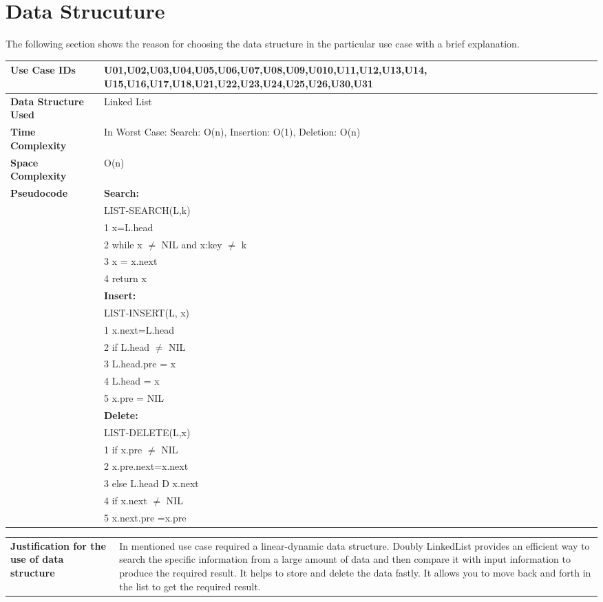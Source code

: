 \documentclass[12pt,a4paper]{report}
\begin{document}
\chapter*{Data Strucuture}
The following section shows the reason for choosing the data structure in the particular use case with a brief explanation.
\begin{center}
\begin{tabular}{ | m{4cm}|m{12cm}| }\hline
\textbf{Use Case IDs}& U01,U02,U03,U04,U05,U06,U07,U08,U09,U010,U11,U12,U13,U14,
U15,U16,U17,U18,U21,U22,U23,U24,U25,U26,U30,U31 \\ \hline
\textbf{Data Structure Used}& Linked List \\ \hline

\textbf{Time Complexity}& 
In Worst Case: Search: O(n), Insertion: O(1), Deletion: O(n)\\\hline
\textbf{Space Complexity}& O(n)\\\hline

\textbf{Pseudocode}& 
\textbf{Search:} \\&
LIST-SEARCH(L,k)\\&
1 x=L.head\\&
2 while x $\neq$ NIL and x:key $\neq$ k \\&
3\hspace{6 mm} x = x.next\\&
4 return x\\&
\textbf{Insert:} \\&
LIST-INSERT(L, x) \\&
1 x.next=L.head \\&
2 if L.head $\neq$ NIL \\&
3\hspace{6 mm} L.head.pre = x \\&
4 L.head = x \\&
5 x.pre = NIL \\&
\textbf{Delete:} \\&
LIST-DELETE(L,x)\\&
1 if x.pre $\neq$ NIL\\&
2\hspace{6 mm} x.pre.next=x.next\\&
3 else L.head D x.next\\&
4 if x.next $\neq$ NIL\\&
5\hspace{6 mm} x.next.pre =x.pre
 \\ \hline
 \end{tabular}
\begin{tabular}{ | m{4cm}|m{12cm}| }\hline
\textbf{Justification for the use of data structure}&
In mentioned use case required a linear-dynamic data structure. 
Doubly LinkedList provides an efficient way to search the specific information from a large amount of data and then compare it with input information to produce the required result. It helps to store and delete the data fastly. It allows you to move back and forth in the list to get the required result.
 

\end{tabular}
\end{center}
\end{document}
